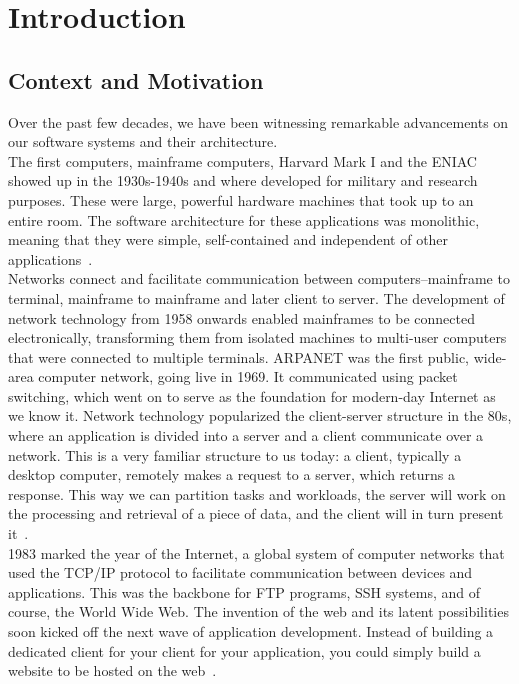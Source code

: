 %
%
\chapter{Introduction} \label{ch:introduction}


\section{Context and Motivation}\label{sec:context-and-motivation}
Over the past few decades, we have been witnessing remarkable advancements on our software systems
and their architecture.\\

The first computers, mainframe computers, Harvard Mark I and the \ac{ENIAC} showed up in the 1930s-1940s and where
developed for military and research purposes.
These were large, powerful hardware machines that took up to an entire room.
The software architecture for these applications was monolithic, meaning that they were simple, self-contained and
independent of other applications~\cite{orkes_software_architecture_evolution, wikipedia_monolithic}.\\

Networks connect and facilitate communication between computers--mainframe to terminal, mainframe to mainframe and
later client to server.
The development of network technology from 1958 onwards enabled mainframes to be connected
electronically, transforming them from isolated machines to multi-user computers that were connected to multiple
terminals.
\ac{ARPANET} was the first public, wide-area computer network, going live in 1969.
It communicated using
packet switching, which went on to serve as the foundation for modern-day Internet as we know it.
Network technology popularized the client-server structure in the 80s, where an application is divided into a
server and a client communicate over a network.
This is a very familiar structure to us today: a client, typically a
desktop computer, remotely makes a request to a server, which returns a response.
This way we can partition tasks
and workloads, the server will work on the processing and retrieval of a piece of data, and the client will in turn
present it~\cite{orkes_software_architecture_evolution, wikipedia_client_server_model}.\\

1983 marked the year of the Internet, a global system of computer networks that used the \ac{TCP/IP} protocol to
facilitate communication between devices and applications.
This was the backbone for \ac{FTP} programs, \ac{SSH} systems, and of course, the World Wide Web.
The invention of the web and its latent possibilities soon kicked off the next wave of application development.
Instead of building a dedicated client for your client for your application, you could simply build a website to be
hosted on the web~\cite{orkes_software_architecture_evolution}.\\

